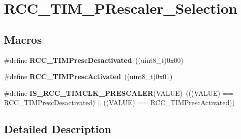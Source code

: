 \hypertarget{group___r_c_c___t_i_m___p_rescaler___selection}{}\section{R\+C\+C\+\_\+\+T\+I\+M\+\_\+\+P\+Rescaler\+\_\+\+Selection}
\label{group___r_c_c___t_i_m___p_rescaler___selection}
\subsection*{Macros}
\begin{DoxyCompactItemize}
\item 
\mbox{\label{group___r_c_c___t_i_m___p_rescaler___selection_ga1c39e60772765b4a2776bacb6d765e9c}} 
\#define {\bfseries R\+C\+C\+\_\+\+T\+I\+M\+Presc\+Desactivated}~((uint8\+\_\+t)0x00)
\item 
\mbox{\label{group___r_c_c___t_i_m___p_rescaler___selection_gaf3911ce80be9f5dbbc1ebb3d6d4ea59d}} 
\#define {\bfseries R\+C\+C\+\_\+\+T\+I\+M\+Presc\+Activated}~((uint8\+\_\+t)0x01)
\item 
\mbox{\label{group___r_c_c___t_i_m___p_rescaler___selection_ga828df772e202d7b95b5424156dbd42e1}} 
\#define {\bfseries I\+S\+\_\+\+R\+C\+C\+\_\+\+T\+I\+M\+C\+L\+K\+\_\+\+P\+R\+E\+S\+C\+A\+L\+ER}(V\+A\+L\+UE)~(((V\+A\+L\+UE) == R\+C\+C\+\_\+\+T\+I\+M\+Presc\+Desactivated) $\vert$$\vert$ ((V\+A\+L\+UE) == R\+C\+C\+\_\+\+T\+I\+M\+Presc\+Activated))
\end{DoxyCompactItemize}


\subsection{Detailed Description}

